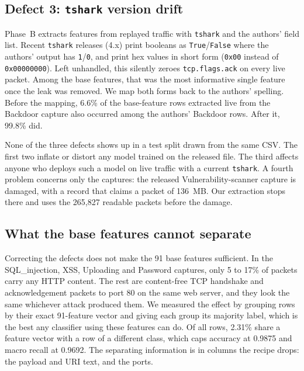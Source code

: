 \subsection{Defect 3: \texttt{tshark} version drift}
Phase~B extracts features from replayed traffic with \texttt{tshark} and the authors' field list. Recent \texttt{tshark} releases (4.x) print booleans as \texttt{True}/\texttt{False} where the authors' output has \texttt{1}/\texttt{0}, and print hex values in short form (\texttt{0x00} instead of \texttt{0x00000000}). Left unhandled, this silently zeroes \texttt{tcp.flags.ack} on every live packet. Among the base features, that was the most informative single feature once the leak was removed. We map both forms back to the authors' spelling. Before the mapping, 6.6\% of the base-feature rows extracted live from the Backdoor capture also occurred among the authors' Backdoor rows. After it, 99.8\% did.

None of the three defects shows up in a test split drawn from the same CSV. The first two inflate or distort any model trained on the released file. The third affects anyone who deploys such a model on live traffic with a current \texttt{tshark}. A fourth problem concerns only the captures: the released Vulnerability-scanner capture is damaged, with a record that claims a packet of 136~MB. Our extraction stops there and uses the 265,827 readable packets before the damage.

\subsection{What the base features cannot separate}
Correcting the defects does not make the 91 base features sufficient. In the SQL\_injection, XSS, Uploading and Password captures, only 5 to 17\% of packets carry any HTTP content. The rest are content-free TCP handshake and acknowledgement packets to port 80 on the same web server, and they look the same whichever attack produced them. We measured the effect by grouping rows by their exact 91-feature vector and giving each group its majority label, which is the best any classifier using these features can do. Of all rows, 2.31\% share a feature vector with a row of a different class, which caps accuracy at 0.9875 and macro recall at 0.9692. The separating information is in columns the recipe drops: the payload and URI text, and the ports.

